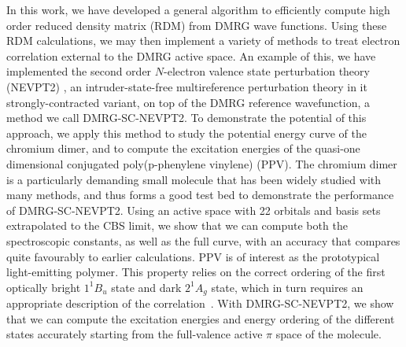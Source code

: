 In this work, we have developed a general algorithm to efficiently compute high order reduced density matrix (RDM) from DMRG wave functions. 
Using these RDM calculations, we may then implement a variety of methods to treat electron correlation external to the DMRG active space.
An example of this, we have implemented the second order $N$-electron valence state perturbation theory (NEVPT2) 
\cite{angeli_introduction_2001,angeli_n-electron_2001, angeli_n-electron_2002}, an intruder-state-free multireference perturbation theory in it strongly-contracted variant, on top
of the DMRG reference wavefunction, a method we call DMRG-SC-NEVPT2.
To demonstrate the potential of this approach, we apply this method to study the potential energy curve of the chromium dimer, and 
to compute the excitation energies of the quasi-one dimensional conjugated poly(p-phenylene vinylene) (PPV). 
The chromium dimer is a particularly demanding small molecule that has been widely studied with many methods\cite{roos_ground_2003,celani_cipt2_2004,angeli_third-order_2006,muller_large-scale_2009,kurashige_second-order_2011,ruiperez_complete_2011,kurashige_multireference_2014,sharma_multireference_2015}, and thus forms a good test bed to demonstrate the performance of DMRG-SC-NEVPT2. Using an active space with 22 orbitals and basis sets extrapolated to the CBS limit, we show that we can
compute both the spectroscopic constants, as well as the full curve,
with an accuracy that compares quite favourably to earlier calculations.
PPV is of interest as the prototypical light-emitting polymer\cite{burroughes_light-emitting_1990,friend_electroluminescence_1999}. This property relies
on the correct ordering of the first optically bright $1^{1}B_{u}$ state
and  dark $2^{1}A_{g}$ state, which in turn requires an appropriate
description of the correlation~\cite{shukla_correlated_2002, bursill_symmetry-adapted_2009,beljonne_theoretical_1995}.
With DMRG-SC-NEVPT2, we show that we can compute the excitation 
energies and energy ordering of the different states accurately starting 
from the full-valence active $\pi$ space of the molecule.

